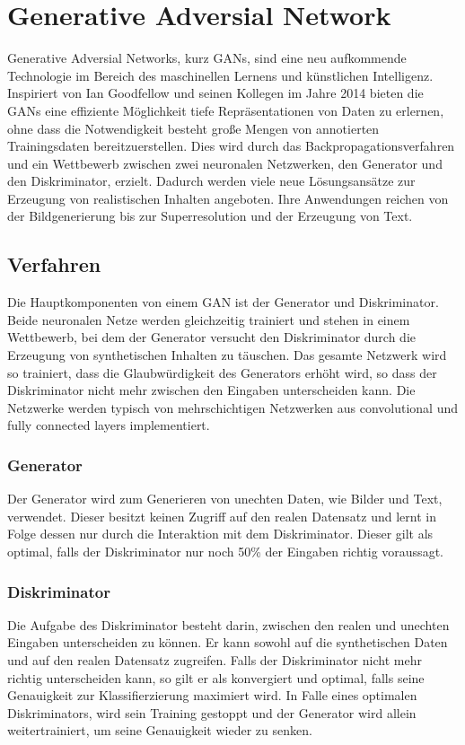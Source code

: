 \chapter*{Generative Adversial Network}


Generative Adversial Networks, kurz GANs, sind eine neu aufkommende Technologie im Bereich des maschinellen Lernens und künstlichen Intelligenz. Inspiriert von Ian Goodfellow und seinen Kollegen im Jahre 2014 bieten die GANs eine effiziente Möglichkeit tiefe Repräsentationen von Daten zu erlernen, ohne dass die Notwendigkeit besteht große Mengen von annotierten Trainingsdaten bereitzuerstellen. 
Dies wird durch das Backpropagationsverfahren und ein Wettbewerb zwischen zwei neuronalen Netzwerken, den Generator und den Diskriminator, erzielt. 
Dadurch werden viele neue Lösungsansätze zur Erzeugung von realistischen Inhalten angeboten. 
Ihre Anwendungen reichen von der Bildgenerierung bis zur Superresolution und der Erzeugung von Text. 

\section*{Verfahren}
Die Hauptkomponenten von einem GAN ist der Generator und Diskriminator. Beide neuronalen Netze werden gleichzeitig trainiert und stehen in einem Wettbewerb, bei dem der Generator versucht den Diskriminator durch die Erzeugung von synthetischen Inhalten zu täuschen. Das gesamte Netzwerk wird so trainiert, dass die Glaubwürdigkeit des Generators erhöht wird, so dass der Diskriminator nicht mehr zwischen den Eingaben unterscheiden kann. Die Netzwerke werden typisch von mehrschichtigen Netzwerken aus convolutional und fully connected layers implementiert. 

\subsection*{Generator}
Der Generator wird zum Generieren von unechten Daten, wie Bilder und Text, verwendet. 
Dieser besitzt keinen Zugriff auf den realen Datensatz und lernt in Folge dessen nur durch die Interaktion mit dem Diskriminator. Dieser gilt als optimal, falls der Diskriminator nur noch 50\% der Eingaben richtig voraussagt. 

\subsection*{Diskriminator}
Die Aufgabe des Diskriminator besteht darin, zwischen den realen und unechten Eingaben unterscheiden zu können. Er kann sowohl auf die synthetischen Daten und auf den realen Datensatz zugreifen. 
Falls der Diskriminator nicht mehr richtig unterscheiden kann, so gilt er als konvergiert und optimal, falls seine Genauigkeit zur Klassifierzierung maximiert wird. In Falle eines optimalen Diskriminators, wird sein Training gestoppt und der Generator wird allein weitertrainiert, um seine Genauigkeit wieder zu senken. 

